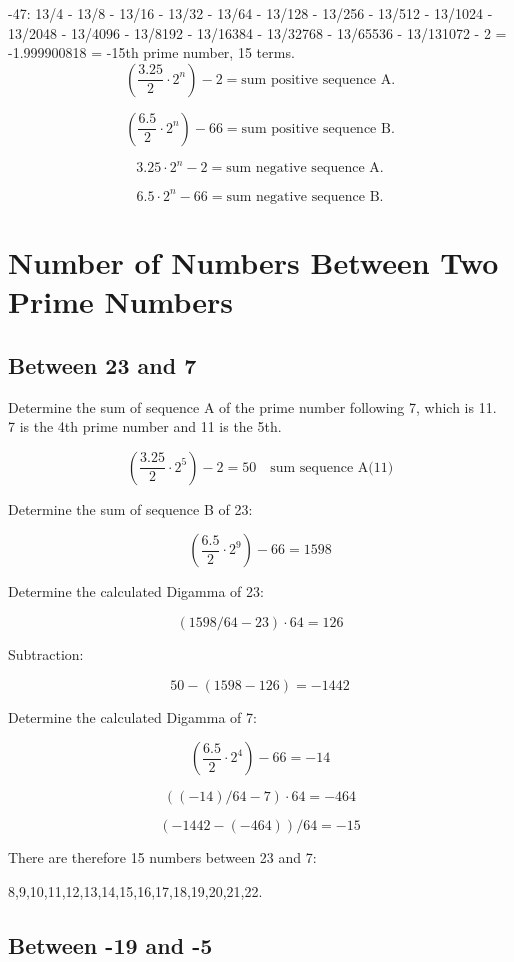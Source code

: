 \documentclass[a4paper,11pt]{article}
\begin{document}
-47: 13/4 - 13/8 - 13/16 - 13/32 - 13/64 - 13/128 - 13/256 - 13/512 - 13/1024 - 13/2048 - 13/4096 - 13/8192 - 13/16384 - 13/32768 - 13/65536 - 13/131072 - 2 = -1.999900818 = -15th prime number, 15 terms.\\

\[
\left(\frac{3.25}{2} \cdot 2^{n}\right) - 2 = \text{sum positive sequence A.}
\]

\[
\left(\frac{6.5}{2} \cdot 2^{n}\right) - 66 = \text{sum positive sequence B.}
\]

\[
3.25 \cdot 2^{n} - 2 = \text{sum negative sequence A.}
\]

\[
6.5 \cdot 2^{n} - 66 = \text{sum negative sequence B.}
\]

\section*{Number of Numbers Between Two Prime Numbers}

\subsection*{Between 23 and 7}

Determine the sum of sequence A of the prime number following 7, which is 11.\\
7 is the 4th prime number and 11 is the 5th.

\[
\left(\frac{3.25}{2} \cdot 2^{5}\right) - 2 = 50 \quad \text{sum sequence A(11)}
\]

Determine the sum of sequence B of 23:

\[
\left(\frac{6.5}{2} \cdot 2^{9}\right) - 66 = 1598
\]

Determine the calculated Digamma of 23:

\[
(1598/64 - 23) \cdot 64 = 126
\]

Subtraction:

\[
50 - (1598 - 126) = -1442
\]

Determine the calculated Digamma of 7:

\[
\left(\frac{6.5}{2} \cdot 2^{4}\right) - 66 = -14
\]

\[
((-14)/64 - 7) \cdot 64 = -464
\]

\[
(-1442 - (-464))/64 = -15
\]

There are therefore 15 numbers between 23 and 7:

8,9,10,11,12,13,14,15,16,17,18,19,20,21,22.

\subsection*{Between -19 and -5}
\end{document}

